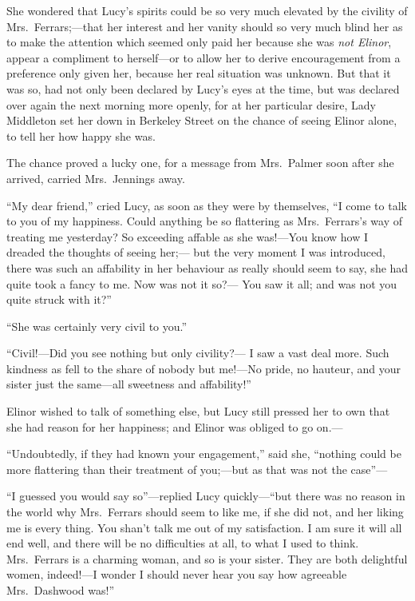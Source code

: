 \documentclass{article}
\begin{document}
She wondered that Lucy's spirits could be so very much
elevated by the civility of Mrs.\ Ferrars;---that her interest
and her vanity should so very much blind her as to make
the attention which seemed only paid her because she was
\emph{not Elinor}, appear a compliment to herself---or to allow
her to derive encouragement from a preference only given her,
because her real situation was unknown.  But that it was so,
had not only been declared by Lucy's eyes at the time,
but was declared over again the next morning more openly,
for at her particular desire, Lady Middleton set her down
in Berkeley Street on the chance of seeing Elinor alone,
to tell her how happy she was.

The chance proved a lucky one, for a message from
Mrs.\ Palmer soon after she arrived, carried Mrs.\ Jennings away.

``My dear friend,'' cried Lucy, as soon as they were
by themselves, ``I come to talk to you of my happiness.
Could anything be so flattering as Mrs.\ Ferrars's way
of treating me yesterday?  So exceeding affable as she
was!---You know how I dreaded the thoughts of seeing her;---%
but the very moment I was introduced, there was such an
affability in her behaviour as really should seem to say,
she had quite took a fancy to me.  Now was not it so?---%
You saw it all; and was not you quite struck with it?''

``She was certainly very civil to you.''

``Civil!---Did you see nothing but only civility?---%
I saw a vast deal more.  Such kindness as fell to the share
of nobody but me!---No pride, no hauteur, and your sister
just the same---all sweetness and affability!''

Elinor wished to talk of something else, but Lucy still
pressed her to own that she had reason for her happiness;
and Elinor was obliged to go on.---%

``Undoubtedly, if they had known your engagement,''
said she, ``nothing could be more flattering than their
treatment of you;---but as that was not the case''---%

``I guessed you would say so''---replied Lucy
quickly---``but there was no reason in the world why
Mrs.\ Ferrars should seem to like me, if she did not,
and her liking me is every thing.  You shan't talk me
out of my satisfaction.  I am sure it will all end well,
and there will be no difficulties at all, to what I
used to think.  Mrs.\ Ferrars is a charming woman,
and so is your sister.  They are both delightful women,
indeed!---I wonder I should never hear you say how agreeable
Mrs.\ Dashwood was!''
\end{document}
